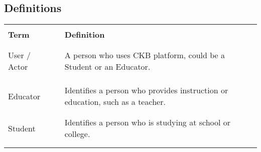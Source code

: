 \subsection{Definitions}
\begin{table}[H]
    \centering
    \renewcommand{\arraystretch}{0.5}
    \begin{tabular}{l l p{10cm}}
        \hline
                            &        &                                                                                                                        \\
        \textbf{Term}       & \vline & \textbf{Definition}                                                                                                    \\
                            &        &                                                                                                                        \\\hline & & \\
        User / Actor        & \vline & A person who uses CKB platform, could be a Student or an Educator.                                                     \\                                                                                                                                                                                                                                 \\
                            &        &                                                                                                                        \\\hline & & \\
        Educator            & \vline & Identifies a person who provides instruction or education, such as a teacher.                                          \\
                            &        &                                                                                                                        \\\hline & & \\
        Student             & \vline & Identifies a person who is studying at school or college.                                                              \\
                            &        &                                                                                                                        \\\hline & & \\

\end{tabular}
\end{table}
